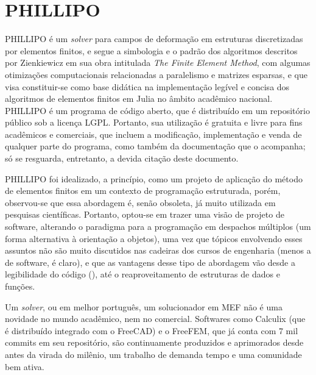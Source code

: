 

\chapter{PHILLIPO}

PHILLIPO é um \emph{solver} para campos de deformação em estruturas discretizadas por elementos finitos, e segue a simbologia e o padrão dos algoritmos descritos por Zienkiewicz em sua obra intitulada \emph{The Finite Element Method}, com algumas otimizações computacionais relacionadas a paralelismo e matrizes esparsas, e que visa constituir-se como base didática na implementação legível e concisa dos algoritmos de elementos finitos em Julia no âmbito acadêmico nacional. PHILLIPO é um programa de código aberto, que é distribuído em um repositório público\footnotemark[1]{} sob a licença LGPL\footnotemark[2]{}. Portanto, sua utilização é gratuita e livre para fins acadêmicos e comerciais, que incluem a modificação, implementação e venda de qualquer parte do programa, como também da documentação que o acompanha; só se resguarda, entretanto, a devida citação deste documento.

PHILLIPO foi idealizado, a princípio, como um projeto de aplicação do método de elementos finitos em um contexto de programação estruturada, porém, observou-se que essa abordagem é, senão obsoleta, já muito utilizada em pesquisas científicas. Portanto, optou-se em trazer uma visão de projeto de software, alterando o paradigma para a programação em despachos múltiplos (um forma alternativa à orientação a objetos), uma vez que tópicos envolvendo esses assuntos não são muito discutidos nas cadeiras dos cursos de engenharia (menos a de software, é claro), e que as vantagens desse tipo de abordagem vão desde a legibilidade do código (), até o reaproveitamento de estruturas de dados e funções. \cite{Bezanson}

Um \emph{solver}, ou em melhor português, um solucionador em MEF não é uma novidade no mundo acadêmico, nem no comercial. Softwares como Calculix (que é distribuído integrado com o FreeCAD) e o FreeFEM, que já conta com 7 mil commits em seu repositório, são continuamente produzidos e aprimorados desde antes da virada do milênio, um trabalho de demanda tempo e uma comunidade bem ativa.


